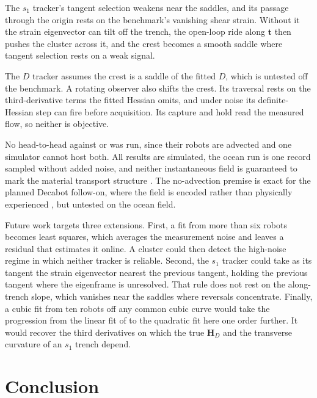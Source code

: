 \documentclass[lettersize,journal]{IEEEtran}
\begin{document}
The $s_1$ tracker's tangent selection weakens near the saddles, and its
passage through the origin rests on the benchmark's vanishing shear
strain. Without it the strain eigenvector
can tilt off the trench, the open-loop ride along $\mathbf{t}$ then
pushes the cluster across it, and the crest becomes a smooth saddle where
tangent selection rests on a weak signal.

The $D$ tracker assumes the crest is a saddle of the fitted $D$, which is
untested off the benchmark. A rotating observer also shifts the crest. Its
traversal rests on the third-derivative terms the fitted Hessian omits,
and under noise its definite-Hessian step can fire before acquisition.
Its capture and hold read the measured flow, so neither is objective.

No head-to-head against \cite{26,27,28} or \cite{29} was run, since
their robots are advected and one simulator cannot host both. All results
are simulated, the ocean run is one record sampled without added noise,
and neither instantaneous field is guaranteed to mark the material
transport structure \cite{18}. The no-advection premise is exact for the
planned Decabot follow-on, where the field is encoded rather than
physically experienced \cite{32}, but untested on the ocean field.

Future work targets three extensions. First, a fit from more than six
robots becomes least squares, which averages the measurement noise and
leaves a residual that estimates it online. A cluster could then detect the
high-noise regime in which neither tracker is reliable. Second, the
$s_1$ tracker could take as its tangent the strain eigenvector nearest the
previous tangent, holding the previous tangent where the eigenframe is
unresolved. That rule does not rest on the along-trench slope, which
vanishes near the saddles where reversals concentrate. Finally, a cubic fit
from ten robots off any common cubic curve would take the progression from
the linear fit of \cite{10} to the quadratic fit here one order further. It
would recover the third derivatives on which the true $\mathbf{H}_D$ and
the transverse curvature of an $s_1$ trench depend.

\section{Conclusion}
\end{document}
